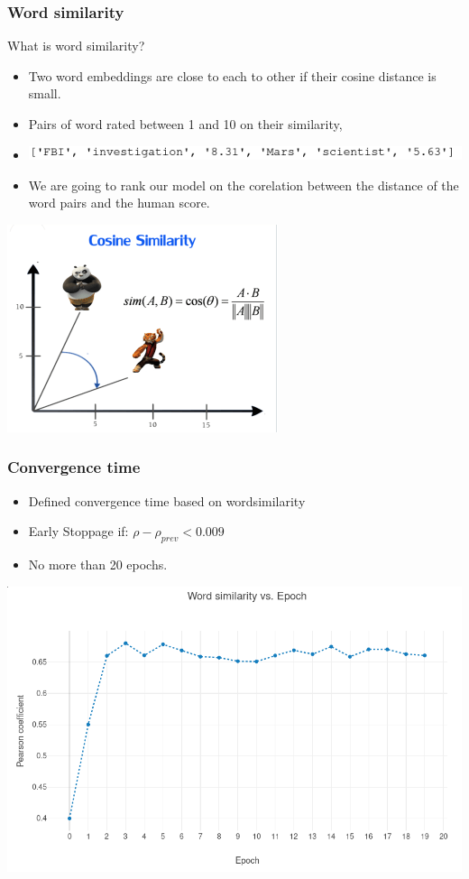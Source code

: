 \begin{frame}
\frametitle{Word similarity}
\begin{Large}
What is word similarity? 
\end{Large}
\medskip
\begin{itemize}
\item Two word embeddings are close to each to other if their cosine distance is small. 
\item Pairs of word rated between 1 and 10 on their similarity, 
\item \includegraphics[scale=0.5]{images/wordsim353_example}
\item We are going to rank our model on the corelation between the distance of the word pairs and the human score.
\end{itemize}
\centerline{ \includegraphics[scale=0.4]{images/cosine}}
\end{frame}
\begin{frame}
\frametitle{Convergence time}
\begin{itemize}
\item Defined convergence time based on wordsimilarity
\item Early Stoppage if: $ \rho -  \rho_{prev} < 0.009$ 
\item No more than 20 epochs. 
\end{itemize}
\includegraphics[scale=0.3]{images/wordsim_convergence}
\end{frame}
